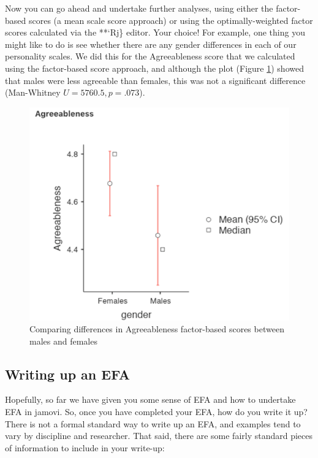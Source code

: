 \documentclass[
]{book}
\begin{document}
Now you can go ahead and undertake further analyses, using either the factor-based scores (a mean scale score approach) or using the optimally-weighted factor scores calculated via the **`Rj\} editor. Your choice! For example, one thing you might like to do is see whether there are any gender differences in each of our personality scales. We did this for the Agreeableness score that we calculated using the factor-based score approach, and although the plot (Figure \ref{fig:fa12}) showed that males were less agreeable than females, this was not a significant difference (Man-Whitney \(U=5760.5, p=.073\)).

\begin{figure}

{\centering \includegraphics[width=1\linewidth]{img/factoranalysis/fa12} 

}

\caption{Comparing differences in Agreeableness factor-based scores between males and females}\label{fig:fa12}
\end{figure}

\hypertarget{writing-up-an-efa}{%
\subsection{Writing up an EFA}\label{writing-up-an-efa}}

Hopefully, so far we have given you some sense of EFA and how to undertake EFA in jamovi. So, once you have completed your EFA, how do you write it up? There is not a formal standard way to write up an EFA, and examples tend to vary by discipline and researcher. That said, there are some fairly standard pieces of information to include in your write-up:
\end{document}
